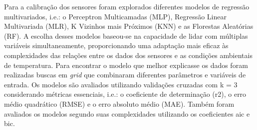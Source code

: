 Para a calibração dos sensores foram explorados diferentes modelos de regressão multivariados, i.e.: o Perceptron Multicamadas (MLP), Regressão Linear Multivariada (MLR), K Vizinhos mais Próximos (KNN) e as Florestas Aleatórias (RF). A escolha desses modelos baseou-se na capacidade de lidar com múltiplas variáveis simultaneamente, proporcionando uma adaptação mais eficaz às complexidades das relações entre os dados dos sensores e as condições ambientais de temperatura. Para encontrar o modelo que melhor explicasse os dados foram realizadas buscas em \textit{grid} que combinaram diferentes parâmetros e variáveis de entrada. Os modelos são avaliados utilizando validações cruzadas com k = 3 considerando métricas essenciais, i.e.: o coeficiente de determinação (r2), o erro médio quadrático (RMSE) e o erro absoluto médio (MAE). Também foram avaliados os modelos segundo suas complexidades utilizando os coeficientes \acrshort{aic} e \acrshort{bic}.